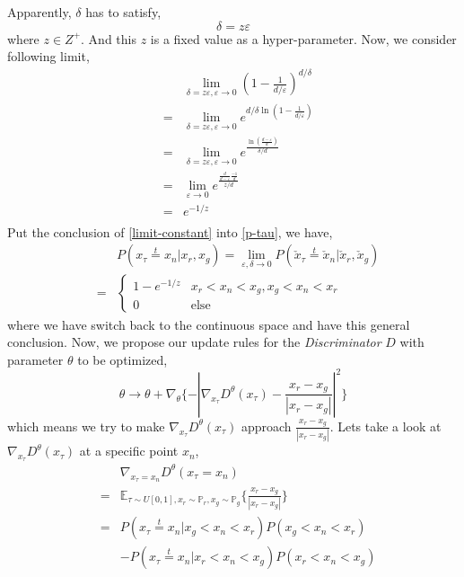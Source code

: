 \documentclass[letterpaper]{article} %
\begin{document}
Apparently, $\delta$ has to satisfy,
\begin{equation}\label{deltal-satisfy}
  \delta = z \varepsilon
\end{equation}
where $z \in Z^{+}$. And this $z$ is a fixed value as a hyper-parameter.
Now, we consider following limit,
\begin{eqnarray}\label{limit-constant}
    && \lim_{\delta=z\varepsilon,\varepsilon\rightarrow 0} (1-\frac{1}{d/\varepsilon})^{d/\delta} \nonumber\\
    \nonumber &=& \lim_{\delta=z\varepsilon,\varepsilon\rightarrow 0} e^{d/\delta \ln(1-\frac{1}{d/\varepsilon})} \\
    \nonumber &=& \lim_{\delta=z\varepsilon,\varepsilon\rightarrow 0} e^{\frac{\ln(\frac{d-\varepsilon}{d})}{\delta/d}} \\
    \nonumber &=& \lim_{\varepsilon\rightarrow0} e^{\frac{\frac{d}{d-\varepsilon}\frac{-1}{d}}{z/d}} \\
    \nonumber &=& e^{-1/z} \\
\end{eqnarray}
Put the conclusion of \eqref{limit-constant} into \eqref{p-tau}, we have,
\begin{eqnarray}\label{final-p-inter}
    && P(x_\tau\overset{t}{=}x_n|x_r,x_g) = \lim_{\varepsilon,\delta\rightarrow0} P(\check{x}_\tau\overset{t}{=}\check{x}_n|\check{x}_r,\check{x}_g) \nonumber\\
    &=&
    \begin{cases}
        1 - e^{-1/z} &\mbox{$x_r<x_n<x_g,x_g<x_n<x_r$}\\
        0 &\mbox{else}
    \end{cases}
\end{eqnarray}
where we have switch back to the continuous space and have this general conclusion.
Now, we propose our update rules for the \textit{Discriminator} $D$ with parameter $\theta$ to be optimized,
\begin{equation}\label{d-loss}
  \theta \longrightarrow \theta + \nabla_{\theta} \{ - |\nabla_{x_{\tau}}D^{\theta}(x_{\tau})-\frac{x_{r}-x_{g}}{|x_{r}-x_{g}|}|^2 \}
\end{equation}
which means we try to make $\nabla_{x_{\tau}}D^{\theta}(x_{\tau})$ approach $\frac{x_{r}-x_{g}}{|x_{r}-x_{g}|}$. Lets take a look at $\nabla_{x_{\tau}}D^{\theta}(x_{\tau})$ at a specific point $x_n$,
\begin{eqnarray}\label{d-at-xn}
    && \nabla_{x_{\tau}=x_n} D^{\theta}(x_{\tau}=x_n) \nonumber\\
    &=& \mathbb{E}_{\tau \sim U[0,1], x_r\sim\mathbb{P}_r,x_g\sim\mathbb{P}_g} \{\frac{x_{r}-x_{g}}{|x_{r}-x_{g}|}\} \nonumber\\
    &=& P(x_\tau\overset{t}{=}x_n|x_g<x_n<x_r) P(x_g<x_n<x_r) \nonumber\\
    && - P(x_\tau\overset{t}{=}x_n|x_r<x_n<x_g) P(x_r<x_n<x_g) \nonumber\\
\end{eqnarray}
\end{document}
